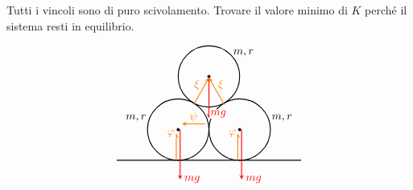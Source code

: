 \begin{example}{}
Tutti i vincoli sono di puro scivolamento. Trovare il valore minimo di \(K\) perché il sistema resti in equilibrio.

\[
\begin{tikzpicture}[scale=1.2, >=stealth]
  \draw[thick] (-2.4,0) -- (2.4,0);

  \draw[thick] (-0.8,0.8) circle (0.8);
  \draw[thick] (0.8,0.8) circle (0.8);
  \draw[thick] (0,2.185) circle (0.8);

  \filldraw (-0.8,0.8) circle (1pt);
  \filldraw (0.8,0.8) circle (1pt);
  \filldraw (0,2.185) circle (1pt);

  \node at (-1.9,1.1) {\(m,r\)};
  \node at (1.9,1.1) {\(m,r\)};
  \node at (0.9,2.8) {\(m,r\)};

  \draw[red, thick, ->] (0,2.185) -- (0,1.1) node[pos=0.9, right, fill=white, inner sep=1pt] {\(mg\)};

  \draw[red, thick, ->] (-0.75,0.8) -- (-0.75,-0.5) node[right] {\(mg\)};
  \draw[orange, thick, ->] (-0.85,0) -- (-0.85,0.7) node[left, fill=white, inner sep=1pt] {\(\varphi\)};

  \draw[red, thick, ->] (0.85,0.8) -- (0.85,-0.5) node[right] {\(mg\)};
  \draw[orange, thick, ->] (0.75,0) -- (0.75,0.7) node[left, fill=white, inner sep=1pt] {\(\varphi\)};

  \draw[orange, thick, ->] (-0.4,1.45) -- (0,2.15) node[midway, above left, fill=white, inner sep=1pt] {\(\xi\)};
  \draw[orange, thick, ->] (0.4,1.45) -- (0,2.15) node[midway, above right, fill=white, inner sep=1pt] {\(\xi\)};

  \draw[orange, thick, ->] (-0.1, 0.95) -- (-0.7, 0.95) node[midway, above, fill=white, inner sep=1pt] {\(\psi\)};


\end{tikzpicture}\]
\end{example}
